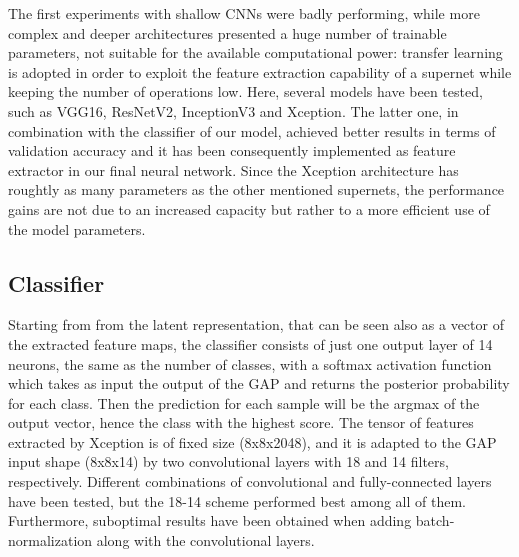 \documentclass[conference]{IEEEtran}
\begin{document}
The first experiments with shallow CNNs were badly performing, while more
complex and deeper architectures presented a huge number of trainable
parameters, not suitable for the available computational power: transfer
learning is adopted in order to exploit the feature extraction capability of a supernet
while keeping the number of operations low.
Here, several models have been tested, such as VGG16, ResNetV2, InceptionV3 and 
Xception. The latter one, in combination with the classifier of our
model, achieved better results in terms of validation accuracy and it has been consequently
implemented as feature extractor in our final neural network.
Since the Xception architecture has roughtly as many parameters as the other
mentioned supernets, the performance gains are not due
to an increased capacity but rather to a more efficient use of the model parameters.

\subsection{Classifier}
Starting from from the latent representation, that can be seen also as a vector of the
extracted feature maps, the classifier consists of just one output layer of 14
neurons, the same as the number of classes, with a softmax activation function which
takes as input the output of the GAP and returns the posterior probability for each
class. Then the prediction for each sample will be the argmax of the output
vector, hence the class with the highest score. The tensor of features
extracted by Xception is of fixed size (8x8x2048), and it is adapted to the
GAP input shape (8x8x14) by two convolutional layers with 18 and 14 filters,
respectively. Different combinations of convolutional and fully-connected layers have
been tested, but the 18-14 scheme performed best among all of them. Furthermore,
suboptimal results have been obtained when adding batch-normalization along with
the convolutional layers.
\end{document}
